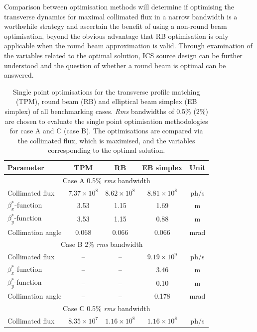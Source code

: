 \documentclass[../main.tex]{subfiles}
\begin{document}
Comparison between optimisation methods will determine if optimising the transverse dynamics for maximal collimated flux in a narrow bandwidth is a worthwhile strategy and ascertain the benefit of using a non-round beam optimisation, beyond the obvious advantage that RB optimisation is only applicable when the round beam approximation is valid. Through examination of the variables related to the optimal solution, ICS source design can be further understood and the question of whether a round beam is optimal can be answered.      
\begin{table}[!h]
\centering
\caption{Single point optimisations for the transverse profile matching (TPM), round beam (RB) and elliptical beam simplex (EB simplex) of all benchmarking cases. \textit{Rms} bandwidths of 0.5\% (2\%) are chosen to evaluate the single point optimisation methodologies for case A and C (case B). The optimisations are compared via the collimated flux, which is maximised, and the variables corresponding to the optimal solution.}
\vspace{3mm}
\begin{threeparttable}
\begin{tabular}{lcccc}
\hline\hline
Parameter & TPM & RB & EB simplex & Unit \\
\hline
\multicolumn{5}{c}{Case A 0.5\% \textit{rms} bandwidth} \\
\hline
Collimated flux & $7.37\times 10^{8}$ & $8.62\times 10^{8}$ & $8.81\times 10^{8}$ & ph/\si{\second} \\
$\beta_{x}^{*}$-function & 3.53 & 1.15 & 1.69 & \si{\meter}\\
$\beta_{y}^{*}$-function & 3.53 & 1.15 & 0.88 & \si{\meter}\\
Collimation angle & 0.068 & 0.066 & 0.066 & \si{\milli\radian}\\
\hline
\multicolumn{5}{c}{Case B 2\% \textit{rms} bandwidth~\tnote{*} ~\tnote{$\dagger$}} \\
\hline
Collimated flux & -- & -- & $9.19\times 10^{9}$ & ph/\si{\second} \\
$\beta_{x}^{*}$-function & -- & -- & 3.46 & \si{\meter} \\
$\beta_{y}^{*}$-function & -- & -- & 0.10 & \si{\meter} \\
Collimation angle & -- & -- & 0.178 & \si{\milli\radian} \\ 
\hline
\multicolumn{5}{c}{Case C 0.5\% \textit{rms} bandwidth} \\
\hline
Collimated flux & $8.35\times 10^{7}$ & $1.16\times 10^{8}$ & $1.16\times 10^{8}$ & ph/\si{\second} \\

\end{tabular}
\end{threeparttable}
\end{table}
\end{document}
